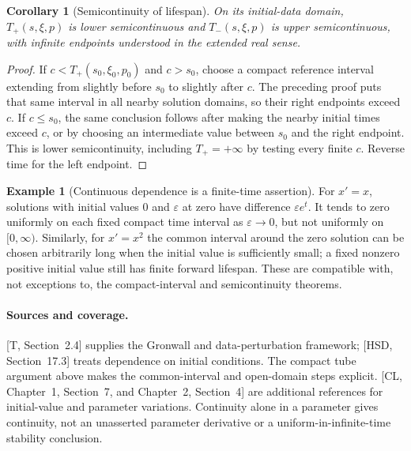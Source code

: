 \documentclass[11pt,oneside]{book}
\newtheorem{corollary}[theorem]{Corollary}
\theoremstyle{definition}
\newtheorem{example}[theorem]{Example}
\theoremstyle{remark}\newtheorem{remark}[theorem]{Remark}
\begin{document}
\begin{corollary}[Semicontinuity of lifespan]\label{d13:05:lifespan}
On its initial-data domain, $T_+(s,\xi,p)$ is lower semicontinuous
and $T_-(s,\xi,p)$ is upper semicontinuous, with infinite endpoints
understood in the extended real sense.
\end{corollary}
\begin{proof}
If $c<T_+(s_0,\xi_0,p_0)$ and $c>s_0$, choose a compact reference
interval extending from slightly before $s_0$ to slightly after $c$.
The preceding proof puts that same interval in all nearby solution
domains, so their right endpoints exceed $c$. If $c\leq s_0$, the
same conclusion follows after making the nearby initial times exceed
$c$, or by choosing an intermediate value between $s_0$ and the right
endpoint. This is lower semicontinuity, including $T_+=+\infty$ by
testing every finite $c$. Reverse time for the left endpoint.
\end{proof}

\begin{example}[Continuous dependence is a finite-time assertion]\label{d13:05:finite-time}
For $x'=x$, solutions with initial values $0$ and $\varepsilon$ at
zero have difference $\varepsilon e^t$. It tends to zero uniformly on
each fixed compact time interval as $\varepsilon\to0$, but not
uniformly on $[0,\infty)$. Similarly, for $x'=x^2$ the common interval
around the zero solution can be chosen arbitrarily long when the
initial value is sufficiently small; a fixed nonzero positive initial
value still has finite forward lifespan. These are compatible with,
not exceptions to, the compact-interval and semicontinuity theorems.
\end{example}

\paragraph{Sources and coverage.}
[T, Section~2.4] supplies the Gronwall and data-perturbation framework;
[HSD, Section~17.3] treats dependence on initial conditions. The compact
tube argument above makes the common-interval and open-domain steps
explicit. [CL, Chapter~1, Section~7, and Chapter~2, Section~4] are
additional references for initial-value and parameter variations.
Continuity alone in a parameter gives continuity, not an unasserted
parameter derivative or a uniform-in-infinite-time stability conclusion.



\end{document}
